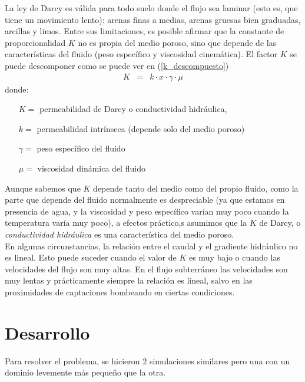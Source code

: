 \documentclass[10pt,a4paper,final]{article}
\begin{document}
%
La ley de Darcy es válida para todo suelo donde el flujo sea laminar (esto es, que tiene un movimiento lento): arenas finas a medias, arenas gruesas bien graduadas, arcillas y limos. Entre sus limitaciones, es posible afirmar que la constante de proporcionalidad $K$ no es propia del medio poroso, sino que depende de las características del fluido (peso específico y viscosidad cinemática). 
El factor $K$ se puede descomponer como se puede ver en (\ref{k_descompuesto}) 
\begin{eqnarray}
	K&=& k \cdot x \cdot \gamma \cdot \mu \label{k_descompuesto}
\end{eqnarray}
donde: 
\begin{itemize}
	\item[$K=$] permeabilidad de Darcy o conductividad hidráulica,
	\item[$k=$] permeabilidad intrínseca (depende solo del medio poroso)
	\item[$\gamma=$] peso específico del fluido
	\item[$\mu=$] viscosidad dinámica del fluido
\end{itemize}
Aunque sabemos que $K$ depende tanto del medio como del propio fluido, como la parte que depende del fluido normalmente es despreciable (ya que estamos en presencia de agua, y la viscosidad y peso específico varían muy poco cuando la temperatura varía muy poco), a efectos práctico,s asumimos que la $K$ de Darcy, o \emph{conductividad hidráulica} es una característica del medio poroso.
\\
En algunas circunstancias, la relación entre el caudal y el gradiente hidráulico no es lineal.
Esto puede suceder cuando el valor de $K$ es muy bajo o cuando las velocidades del flujo son muy altas.
En el flujo subterráneo las velocidades son muy lentas y prácticamente siempre la relación es lineal, salvo en las proximidades de captaciones bombeando en ciertas condiciones.
\section{Desarrollo}
Para resolver el problema, se hicieron 2 simulaciones similares pero una con un dominio levemente más pequeño que la otra.
\end{document}
